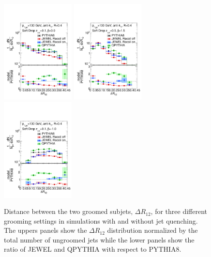 \begin{figure}[th!]
\centering
\includegraphics[width=0.33\textwidth]{figures/SDGen/DR12CompModelsBeta00Z01.pdf}%
\includegraphics[width=0.33\textwidth]{figures/SDGen/DR12CompModelsBeta15Z05.pdf}%
\includegraphics[width=0.33\textwidth]{figures/SDGen/DR12CompModelsBetam1Z01.pdf}%
\caption{Distance between the two groomed subjets, $\Delta R_{12}$, for three different grooming settings in simulations with and without jet quenching. The uppers panels show the $\Delta R_{\mathrm{12}}$ distribution normalized by the total number of ungroomed jets while the lower panels show the ratio of JEWEL and QPYTHIA with respect to PYTHIA8.}
\label{fig:SDGenDR12}
\end{figure}
